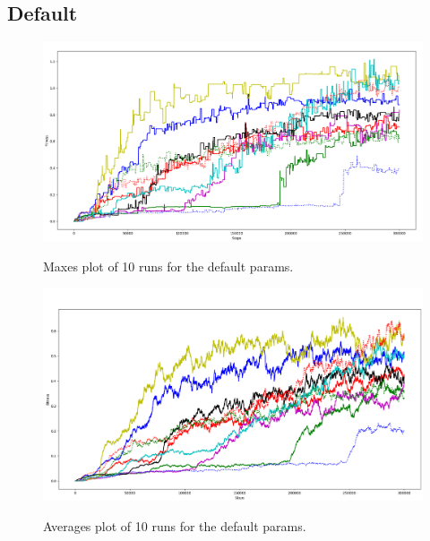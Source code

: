 \documentclass[a4]{article}
\begin{document}
\subsection{Default}
\begin{figure}[H]
	\includegraphics[scale=0.31]{def }
	\label{fig:def}
	\caption{Maxes plot of 10 runs for the default params.}
\end{figure}
\begin{figure}[H]
	\includegraphics[scale=0.31]{avdef}
	\label{fig:defav}
	\caption{Averages plot of 10 runs for the default params.}
\end{figure}
\end{document}
